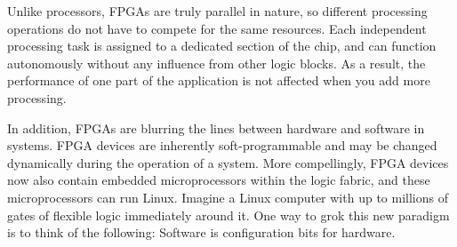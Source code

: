 Unlike processors, FPGAs are truly parallel in nature, so
different processing operations do not have to compete for the same
resources. Each independent processing task is assigned to a dedicated
section of the chip, and can function autonomously without any influence
from other logic blocks. As a result, the performance of one part of the
application is not affected when you add more processing.

In addition, FPGAs are blurring the lines between hardware and software in systems.
FPGA devices are inherently soft-programmable and may be changed
dynamically during the operation of a system. More compellingly, FPGA devices
now also contain embedded microprocessors within the logic fabric,
and these microprocessors can run Linux. Imagine a Linux computer
with up to millions of gates of flexible logic immediately around
it. One way to grok this new paradigm is to think of the following:
Software is configuration bits for hardware.
